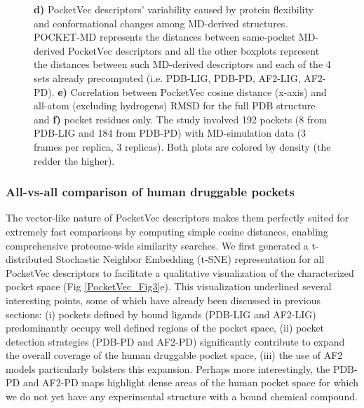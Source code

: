 \begin{figure}[htbp]
{    \textbf{d)} PocketVec descriptors’ variability caused by protein flexibility and conformational changes among MD-derived structures. POCKET-MD represents the distances between same-pocket MD-derived PocketVec descriptors and all the other boxplots represent the distances between such MD-derived descriptors and each of the 4 sets already precomputed (i.e. PDB-LIG, PDB-PD, AF2-LIG, AF2-PD).
    \textbf{e)} Correlation between PocketVec cosine distance (x-axis) and all-atom (excluding hydrogens) RMSD for the full PDB structure and
    \textbf{f)} pocket residues only. The study involved 192 pockets (8 from PDB-LIG and 184 from PDB-PD) with MD-simulation data (3 frames per replica, 3 replicas). Both plots are colored by density (the redder the higher).
  }
  \label{PocketVec_Fig4}
\end{figure}



\subsubsection{All-vs-all comparison of human druggable pockets}
\label{PocketVec_ResultsAndDiscussion_All_vs_All_comparison_human_druggable_pockets}

The vector-like nature of PocketVec descriptors makes them perfectly suited for extremely fast comparisons by computing simple cosine distances, enabling comprehensive proteome-wide similarity searches. We first generated a t-distributed Stochastic Neighbor Embedding (t-SNE) representation for all PocketVec descriptors to facilitate a qualitative visualization of the characterized pocket space (Fig \ref{PocketVec_Fig3}e). This visualization underlined several interesting points, some of which have already been discussed in previous sections: (i) pockets defined by bound ligands (PDB-LIG and AF2-LIG) predominantly occupy well defined regions of the pocket space, (ii) pocket detection strategies (PDB-PD and AF2-PD) significantly contribute to expand the overall coverage of the human druggable pocket space, (iii) the use of AF2 models particularly bolsters this expansion. Perhaps more interestingly, the PDB-PD and AF2-PD maps highlight dense areas of the human pocket space for which we do not yet have any experimental structure with a bound chemical compound.

